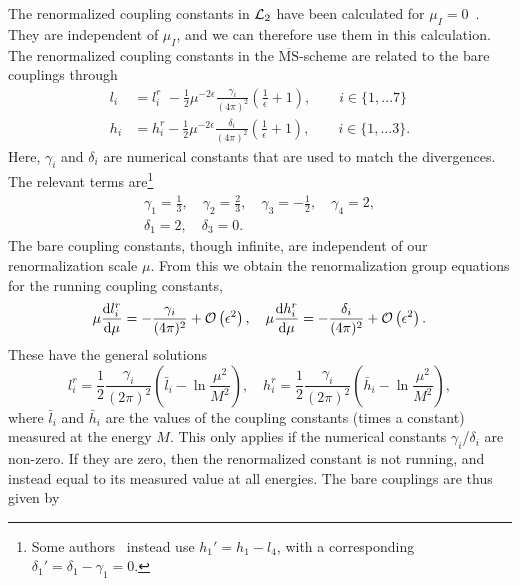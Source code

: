 The renormalized coupling constants in $\mathcal{L}_2$ have been calculated for $\mu_I = 0$~\cite{Gasser-Leutwyler:chiral}.
They are independent of $\mu_I$, and we can therefore use them in this calculation.
The renormalized coupling constants in the $\overline{\mathrm{MS}}$-scheme are related to the bare couplings through
\begin{align}
    l_i 
    & = 
    l_i^r \, \,
    - \frac{1}{2} \mu^{-2\epsilon} \frac{\gamma_i }{(4 \pi)^2} 
    \left(\frac{1}{\epsilon} + 1 \right),
    \quad \quad
    i \in \{1, ... 7\} 
    \\
    h_i 
    & = 
    h_i^r
    -\frac{1}{2} \mu^{-2\epsilon}  \frac{\delta_i }{(4 \pi)^2} 
    \left(\frac{1}{\epsilon} + 1 \right), 
    \quad \quad
    i \in \{1, ... 3\}.
\end{align}
Here, $\gamma_i$ and $\delta_i$ are numerical constants that are used to match the divergences.
The relevant terms are\footnote{Some authors~\cite{Andersen:two-flavor-chpt,GERBER1989387} instead use $h_1' = h_1 - l_4$, with a corresponding $\delta_1' = \delta_1 - \gamma_1 = 0$.}
\begin{gather}
    \gamma_1 = \frac{1}{3}, \quad
    \gamma_2 = \frac{2}{3}, \quad
    \gamma_3 = - \frac{1}{2}, \quad
    \gamma_4 = 2, \\
    \delta_1 = 2, \quad
    \delta_3 = 0.
\end{gather}
The bare coupling constants, though infinite, are independent of our renormalization scale $\mu$.
From this we obtain the renormalization group equations for the running coupling constants,
\begin{equation}
    \mu \diff{l_i^r}{\mu } = - \frac{\gamma_i}{(4 \pi)^2} + \Oh{\epsilon}, \quad
    \mu \diff{h_i^r}{\mu } = - \frac{\delta_i}{(4 \pi)^2} + \Oh{\epsilon}.
\end{equation}
These have the general solutions
\begin{equation}
    l_i^r 
    = \frac{1}{2} \frac{\gamma_i}{(2 \pi)^2} 
    \left( \bar l_i - \ln{\frac{\mu^2}{M^2}} \right),
    \quad
    h_i^r 
    = \frac{1}{2} \frac{\gamma_i}{(2 \pi)^2} 
    \left( \bar h_i - \ln{\frac{\mu^2}{M^2}} \right),
\end{equation}
where $\bar l_i$ and $\bar h_i$ are the values of the coupling constants (times a constant) measured at the energy $M$.
This only applies if the numerical constants $\gamma_i$/$\delta_i$ are non-zero.
If they are zero, then the renormalized constant is not running, and instead equal to its measured value at all energies.
The bare couplings are thus given by
